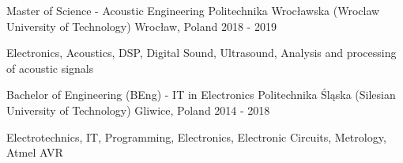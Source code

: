 
\begin{cventries}

  \cventry
  {Master of Science - Acoustic Engineering} %
  {Politechnika Wrocławska (Wroclaw University of Technology)} %
  {Wrocław, Poland} %
  {2018 - 2019} %
  {
    \begin{cvitems} %
      \item {Electronics, Acoustics, DSP, Digital Sound, Ultrasound, Analysis and processing of acoustic signals}
    \end{cvitems}
  }

  \cventry
  {Bachelor of Engineering (BEng) - IT in Electronics} %
  {Politechnika Śląska (Silesian University of Technology)} %
  {Gliwice, Poland} %
  {2014 - 2018} %
  {
    \begin{cvitems} %
      \item {Electrotechnics, IT, Programming, Electronics, Electronic Circuits, Metrology, Atmel AVR}
    \end{cvitems}
  }

\end{cventries}
